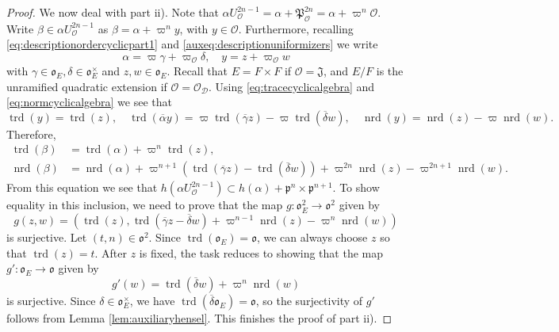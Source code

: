 \documentclass{article}
\theoremstyle{named}
\newcommand{\D}{\mathcal{D}}
\newcommand{\J}{\mathfrak{J}}
\renewcommand{\O}{\mathcal{O}}
\renewcommand{\o}{\mathfrak{o}}
\renewcommand{\P}{\mathfrak{P}}
\newcommand{\p}{\mathfrak{p}}
\DeclareMathOperator{\nrd}{nrd}
\DeclareMathOperator{\trd}{trd}
\begin{document}
\begin{proof}
We now deal with part ii). Note that $\alpha U_\O^{2n-1} = \alpha + \P_\O^{2n} = \alpha + \varpi^n \O$. Write $\beta \in \alpha U_\O^{2n-1}$ as $\beta = \alpha + \varpi^n y$, with $y \in \O$. Furthermore, recalling \eqref{eq:descriptionordercyclicpart1} and \eqref{auxeq:descriptionuniformizers} we write
\begin{equation}\label{auxeq:decompositionelements}
    \alpha = \varpi \gamma + \varpi_\O \delta, \quad y = z + \varpi_\O w
\end{equation}
with $\gamma \in \o_E, \delta \in \o_E^\times$ and $z, w \in \o_E$. Recall that $E = F\times F$ if $\O = \J$, and $E/F$ is the unramified quadratic extension if $\O = \O_\D$. Using \eqref{eq:tracecyclicalgebra} and \eqref{eq:normcyclicalgebra} we see that 
\begin{equation*}
    \trd(y) = \trd(z), \quad \trd(\overline{\alpha}y) = \varpi \trd(\overline{\gamma}z) - \varpi \trd(\overline{\delta}w),\quad \nrd(y) = \nrd(z)-\varpi \nrd(w).
\end{equation*}
Therefore, 
\begin{equation*}
\begin{aligned}
\trd(\beta) & = \trd(\alpha) + \varpi^n \trd(z),\\
\nrd(\beta) & = \nrd(\alpha) + \varpi^{n + 1} (\trd(\overline{\gamma}z)- \trd(\overline{\delta}w)) + \varpi^{2n}\nrd(z) - \varpi^{2n + 1}\nrd(w).
\end{aligned}
\end{equation*}
From this equation we see that $h(\alpha U_\O^{2n-1})\subset h(\alpha) + \p^n \times \p^{n + 1}$. To show equality in this inclusion, we need to prove that the map $g: \o_E^2 \rightarrow \o^2$ given by
\begin{equation*}
    g(z, w) = (\trd(z), \trd(\overline{\gamma}z - \overline{\delta}w) + \varpi^{n-1}\nrd(z) - \varpi^{n}\nrd(w))
\end{equation*}
is surjective. Let $(t, n) \in \o^2$. Since $\trd(\o_E) = \o$, we can always choose $z$ so that $\trd(z) = t$. After $z$ is fixed, the task reduces to showing that the map $g': \o_E \rightarrow \o$ given by
\begin{equation*}
    g'(w) = \trd(\overline{\delta}w) + \varpi^n \nrd(w)
\end{equation*}
is surjective. Since $\delta \in \o_E^\times$, we have $\trd(\overline{\delta}\o_E) = \o$, so the surjectivity of $g'$ follows from Lemma \ref{lem:auxiliaryhensel}. This finishes the proof of part ii).


\end{proof}
\end{document}
